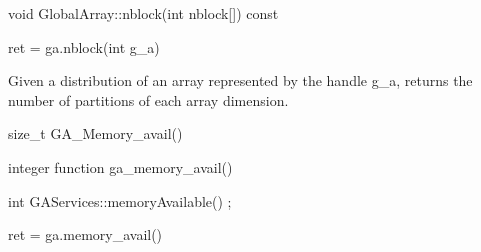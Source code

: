 \documentclass[10pt]{article}
\begin{document}
\begin{cxxapi}
\begin{cxxcode}
void GlobalArray::nblock(int nblock[]) const
\end{cxxcode}
\begin{funcargs}
\end{funcargs}
\end{cxxapi}

\begin{pyapi}
\begin{pycode}
ret = ga.nblock(int g_a)
\end{pycode}
\begin{funcargs}
\end{funcargs}
\end{pyapi}

\local

\begin{desc}

Given a distribution of an array represented by the handle g_a, returns the
number of partitions of each array dimension.

\end{desc}


\begin{capi}
\begin{ccode}
size_t GA_Memory_avail()
\end{ccode}
\end{capi}

\begin{fapi}
\begin{fcode}
integer function ga_memory_avail()
\end{fcode}
\end{fapi}

\begin{cxxapi}
\begin{cxxcode}
int GAServices::memoryAvailable() ;
\end{cxxcode}
\end{cxxapi}

\begin{pyapi}
\begin{pycode}
ret = ga.memory_avail()
\end{pycode}
\end{pyapi}
\end{document}
